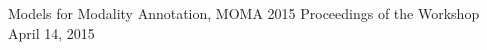 \documentclass[12pt]{book}
\begin{document}
\noindent
\hspace{-0.7in}
\Large
%
%
Models for Modality Annotation, MOMA 2015 
\hfill
Proceedings of the Workshop
\hfill
April 14, 2015 %
\end{document}
